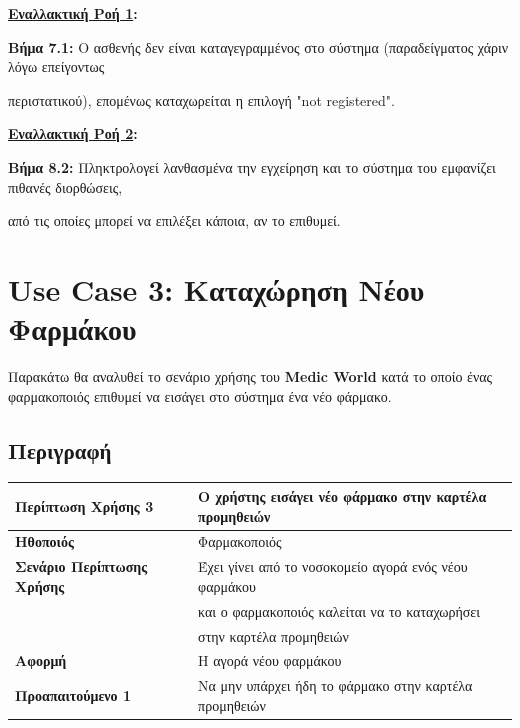\documentclass{article}
\newcommand\T{\rule{0pt}{2.6ex}}       %
\newcommand\B{\rule[-1.2ex]{0pt}{0pt}}
\begin{document}
\newpage
 
\textbf{\underline{Εναλλακτική Ροή 1}:} \vspace{0.005cm} \\
\par \textbf{Βήμα 7.1:} O ασθενής δεν είναι καταγεγραμμένος στο σύστημα (παραδείγματος χάριν λόγω επείγοντως \par περιστατικού), επομένως καταχωρείται η επιλογή "not registered".

\vspace{0.3cm}

\textbf{\underline{Εναλλακτική Ροή 2}:} \vspace{0.005cm} \\
\par \textbf{Βήμα 8.2:} Πληκτρολογεί λανθασμένα την εγχείρηση και το σύστημα του εμφανίζει πιθανές διορθώσεις, \par από τις οποίες μπορεί να επιλέξει κάποια, αν το επιθυμεί. 

\section{Use Case 3: Καταχώρηση Νέου Φαρμάκου }
 
 Παρακάτω θα αναλυθεί το σενάριο χρήσης του \textbf{Medic World} κατά το οποίο ένας φαρμακοποιός επιθυμεί να εισάγει στο σύστημα ένα νέο φάρμακο.
 
\subsection{Περιγραφή}

\begin{center}
     \begin{tabular}{|l|l|}
     \hline
      \textbf{Περίπτωση Χρήσης 3} & Ο χρήστης εισάγει νέο φάρμακο στην καρτέλα προμηθειών \T\B \\ 
      \hline
      \textbf{Ηθοποιός} & Φαρμακοποιός \T\B \\
      \hline
      \textbf{Σενάριο Περίπτωσης Χρήσης} & Έχει γίνει από το νοσοκομείο αγορά ενός νέου φαρμάκου \T \\& και ο φαρμακοποιός καλείται να το καταχωρήσει \\& στην καρτέλα προμηθειών \B \\
      \hline
      \textbf{Αφορμή} & Η αγορά νέου φαρμάκου \T\B \\
      \hline
      \textbf{Προαπαιτούμενο 1} &  Να μην υπάρχει ήδη το φάρμακο στην καρτέλα προμηθειών \T\B \\
      \hline
     \end{tabular}
 \end{center}
 
\end{document}
